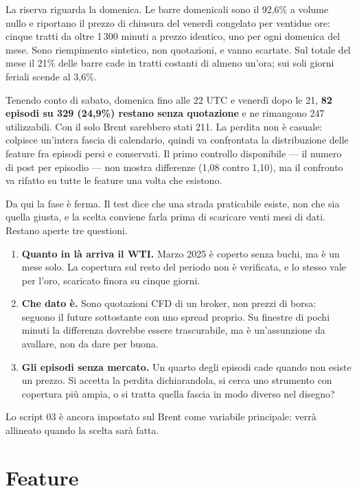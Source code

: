 \documentclass[11pt,a4paper]{article}
\begin{document}
La riserva riguarda la domenica. Le barre domenicali sono il 92,6\% a volume
nullo e riportano il prezzo di chiusura del venerdì congelato per ventidue
ore: cinque tratti da oltre 1\,300 minuti a prezzo identico, uno per ogni
domenica del mese. Sono riempimento sintetico, non quotazioni, e vanno
scartate. Sul totale del mese il 21\% delle
barre cade in tratti costanti di almeno un'ora; sui soli giorni feriali
scende al 3,6\%.

Tenendo conto di sabato, domenica fino alle 22 UTC e venerdì dopo le 21,
\textbf{82 episodi su 329 (24,9\%) restano senza quotazione} e ne rimangono
247 utilizzabili. Con il solo Brent sarebbero stati 211. La perdita non è
casuale: colpisce un'intera fascia di calendario, quindi va confrontata la
distribuzione delle feature fra episodi persi e conservati. Il primo controllo
disponibile — il numero di post per episodio — non mostra differenze (1,08
contro 1,10), ma il confronto va rifatto su tutte le feature una volta che
esistono.

Da qui la fase è ferma. Il test dice che una strada praticabile esiste, non
che sia quella giusta, e la scelta conviene farla prima di scaricare venti
mesi di dati. Restano aperte tre questioni.

\begin{enumerate}
  \item \textbf{Quanto in là arriva il WTI.} Marzo 2025 è coperto senza buchi,
    ma è un mese solo. La copertura sul resto del periodo non è verificata, e
    lo stesso vale per l'oro, scaricato finora su cinque giorni.
  \item \textbf{Che dato è.} Sono quotazioni CFD di un broker, non prezzi di
    borsa: seguono il future sottostante con uno spread proprio. Su finestre
    di pochi minuti la differenza dovrebbe essere trascurabile, ma è
    un'assunzione da avallare, non da dare per buona.
  \item \textbf{Gli episodi senza mercato.} Un quarto degli episodi cade
    quando non esiste un prezzo. Si accetta la perdita dichiarandola, si cerca
    uno strumento con copertura più ampia, o si tratta quella fascia in modo
    diverso nel disegno?
\end{enumerate}

Lo script 03 è ancora impostato sul Brent come variabile principale: verrà
allineato quando la scelta sarà fatta.

\section{Feature}
\end{document}
